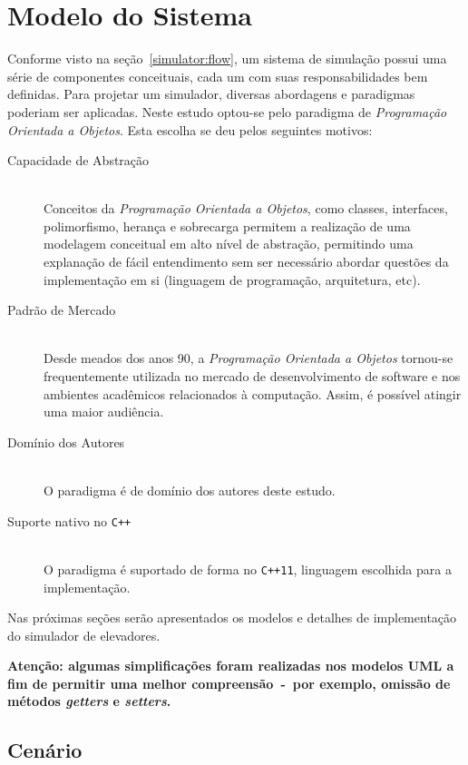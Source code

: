 \chapter{\label{chap:model}Modelo do Sistema}

Conforme visto na seção~\ref{simulator:flow}, um sistema de simulação possui uma
série de componentes conceituais, cada um com suas responsabilidades bem
definidas. Para projetar um simulador, diversas abordagens e paradigmas poderiam
ser aplicadas. Neste estudo optou-se pelo paradigma de \textit{Programação
Orientada a Objetos}. Esta escolha se deu pelos seguintes motivos:

\begin{description}
  \item[Capacidade de Abstração]\hfill \\
    Conceitos da \textit{Programação Orientada a Objetos}, como classes,
    interfaces, polimorfismo, herança e sobrecarga permitem a realização de uma
    modelagem conceitual em alto nível de abstração, permitindo uma explanação
    de fácil entendimento sem ser necessário abordar questões da implementação
    em si (linguagem de programação, arquitetura, etc).
  \item[Padrão de Mercado]\hfill \\
    Desde meados dos anos 90, a \textit{Programação Orientada a Objetos}
    tornou-se frequentemente utilizada no mercado de desenvolvimento de software
    e nos ambientes acadêmicos relacionados à computação. Assim, é possível
    atingir uma maior audiência.
  \item[Domínio dos Autores]\hfill \\
    O paradigma é de domínio dos autores deste estudo.
  \item[Suporte nativo no \texttt{C++}]\hfill \\
    O paradigma é suportado de forma no \texttt{C++11}, linguagem escolhida para
    a implementação.
\end{description}

Nas próximas seções serão apresentados os modelos e detalhes de implementação do
simulador de elevadores.

\textbf{Atenção: algumas simplificações foram realizadas nos modelos UML a fim
de permitir uma melhor compreensão~-~por exemplo, omissão de métodos
\textit{getters} e \textit{setters}.}

\section{\label{model:scenario}Cenário}

